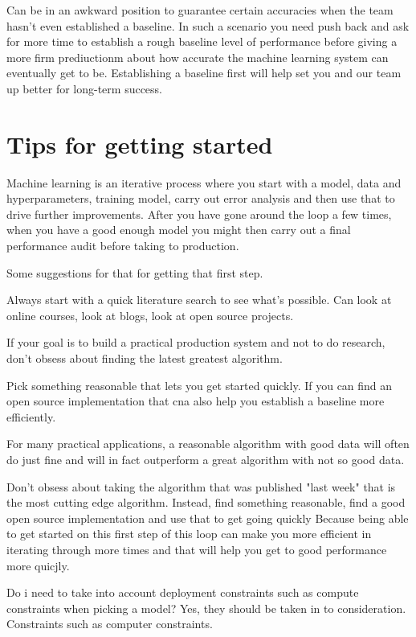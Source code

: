 Can be in an awkward position to guarantee certain accuracies when the team hasn't even established a baseline.
In such a scenario you need push back  and ask for more time to establish a rough baseline level of performance before giving a more firm prediuctionm about how accurate the machine learning system can eventually get to be.
Establishing a baseline first will help set you and our team up better for long-term success.

\section{Tips for getting started}

Machine learning is an iterative process where you start with a model, data and hyperparameters, training model, carry out error analysis and then use that to drive further improvements.
After you have gone around the loop a few times, when you have a good enough model you might then carry out a final performance audit before taking to production.

Some suggestions for that for getting that first step.

Always start with a quick literature search to see what's possible.
Can look at online courses, look at blogs, look at open source projects.

If your goal is to build a practical production system and not to do research, don't obsess about finding the latest greatest algorithm.

Pick something reasonable that lets you get started quickly.
If you can find an open source implementation that cna also help you establish a baseline more efficiently.

For many practical applications, a reasonable algorithm with good data will often do just fine and will in fact outperform a great algorithm with not so good data.


Don't obsess about taking the algorithm that was published "last week" that is the most cutting edge algorithm.
Instead, find something reasonable, find a good open source implementation and use that to get going quickly
Because being able to get started on this first step of this loop can make you more efficient in iterating through more times and that will help you get to good performance more quicjly.

Do i need to take into account deployment constraints such as compute constraints when picking a model?
Yes, they should be taken in to consideration.
Constraints such as computer constraints.

